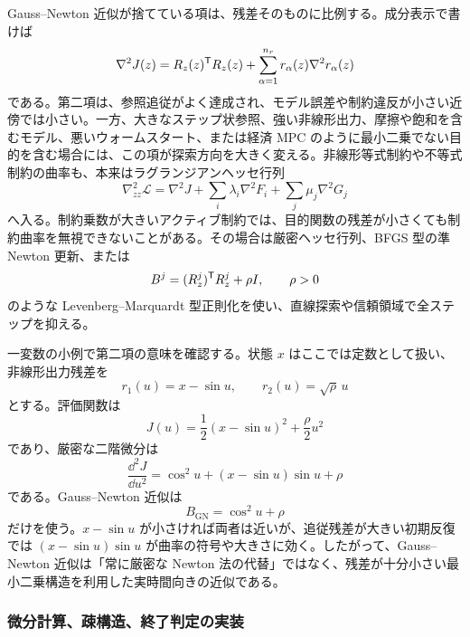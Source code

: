 Gauss--Newton 近似が捨てている項は、残差そのものに比例する。成分表示で書けば
\begin{equation}
  \nabla^2J(z)
  =
  R_z(z)^{\mathsf{T}} R_z(z)
  +\sum_{\alpha=1}^{n_r}r_\alpha(z)\nabla^2r_\alpha(z)
\end{equation}
である。第二項は、参照追従がよく達成され、モデル誤差や制約違反が小さい近傍では小さい。一方、大きなステップ状参照、強い非線形出力、摩擦や飽和を含むモデル、悪いウォームスタート、または経済 MPC のように最小二乗でない目的を含む場合には、この項が探索方向を大きく変える。非線形等式制約や不等式制約の曲率も、本来はラグランジアンヘッセ行列
\begin{equation}
  \nabla_{zz}^{2}\mathcal{L}
  =
  \nabla^2J
  +\sum_i\lambda_i\nabla^2F_i
  +\sum_j\mu_j\nabla^2G_j
\end{equation}
へ入る。制約乗数が大きいアクティブ制約では、目的関数の残差が小さくても制約曲率を無視できないことがある。その場合は厳密ヘッセ行列、BFGS 型の準 Newton 更新、または
\begin{equation}
  B^j=(R_z^j)^{\mathsf{T}} R_z^j+\rho I,
  \qquad
  \rho>0
\end{equation}
のような Levenberg--Marquardt 型正則化を使い、直線探索や信頼領域で全ステップを抑える。

一変数の小例で第二項の意味を確認する。状態 $x$ はここでは定数として扱い、非線形出力残差を
\begin{equation}
  r_1(u)=x-\sin u,
  \qquad
  r_2(u)=\sqrt{\rho}\,u
\end{equation}
とする。評価関数は
\begin{equation}
  J(u)=\frac{1}{2}(x-\sin u)^2+\frac{\rho}{2}u^2
\end{equation}
であり、厳密な二階微分は
\begin{equation}
  \frac{\dd^2J}{\dd u^2}
  =
  \cos^2u+(x-\sin u)\sin u+\rho
\end{equation}
である。Gauss--Newton 近似は
\begin{equation}
  B_{\mathrm{GN}}=\cos^2u+\rho
\end{equation}
だけを使う。$x-\sin u$ が小さければ両者は近いが、追従残差が大きい初期反復では $(x-\sin u)\sin u$ が曲率の符号や大きさに効く。したがって、Gauss--Newton 近似は「常に厳密な Newton 法の代替」ではなく、残差が十分小さい最小二乗構造を利用した実時間向きの近似である。

\subsubsection{微分計算、疎構造、終了判定の実装}

